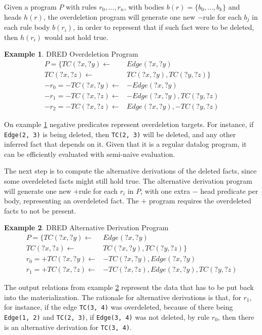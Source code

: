 \documentclass[sigconf,screen,review,natbib]{acmart}
\theoremstyle{definition}
\newtheorem{exmp}{Example}[section]
\begin{document}
Given a program $P$ with rules $r_0, ..., r_n$, with bodies $b(r) = \{b_0, ..., b_k\}$ and heads $h(r)$, the
overdeletion program will generate one new $-$rule for each $b_j$ in each rule body $b(r_i)$, in order to represent
that if such fact were to be deleted, then $h(r_i)$ would not hold true.
\begin{exmp}{DRED Overdeletion Program}
	\begin{align*}
		P = \{TC(?x, ?y) \leftarrow   & Edge(?x, ?y)              \\
		TC(?x, ?z) \leftarrow         & TC(?x, ?y), TC(?y, ?z) \} \\
		-r_0 = -TC(?x, ?y) \leftarrow & -Edge(?x, ?y)             \\
		-r_1 = -TC(?x, ?z) \leftarrow & -Edge(?x, ?y), TC(?y, ?z) \\
		-r_2 = -TC(?x, ?z) \leftarrow & Edge(?x, ?y), -TC(?y, ?z)
	\end{align*}
	\label{ex6}
\end{exmp}
On example \ref{ex6} negative predicates represent overdeletion targets. For instance, if \verb|Edge(2, 3)| is
being deleted, then \verb|TC(2, 3)| will be deleted, and any other inferred fact that depends on it. Given that
it is a regular datalog program, it can be efficiently evaluated with semi-naive evaluation.

The next step is to compute the alternative derivations of the deleted facts, since some overdeleted facts might
still hold true. The alternative derivation program will generate one new $+$rule for each $r_i$ in $P$, with
one extra $-$ head predicate per body, representing an overdeleted fact. The $+$ program requires the overdeleted
facts to not be present.
\begin{exmp}{DRED Alternative Derivation Program}
	\begin{align*}
		P = \{TC(?x, ?y) \leftarrow  & Edge(?x, ?y)                          \\
		TC(?x, ?z) \leftarrow        & TC(?x, ?y), TC(?y, ?z) \}             \\
		r_0 = +TC(?x, ?y) \leftarrow & -TC(?x, ?y), Edge(?x, ?y)             \\
		r_1 = +TC(?x, ?z) \leftarrow & -TC(?x, ?z), Edge(?x, ?y), TC(?y, ?z)
	\end{align*}
	\label{ex7}
\end{exmp}
The output relations from example \ref{ex7} represent the data that has to be put back into the materialization.
The rationale for alternative derivations is that, for $r_1$, for instance, if the edge \verb|TC(3, 4)| was
overdeleted, because of there being \verb|Edge(1, 2)| and \verb|TC(2, 3)|, if \verb|Edge(3, 4)| was not deleted, by
rule $r_0$, then there is an alternative derivation for \verb|TC(3, 4)|.
\end{document}
